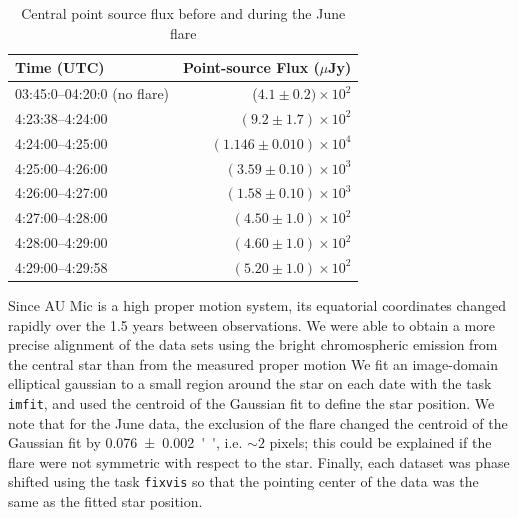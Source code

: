 \documentclass[12pt,oneside]{article}
\begin{document}
\begin{table}	
  \centering
	\caption{Central point source flux before and during the June flare}
  \label{tab:flare fluxes}
  \begin{tabular}{lr}
    \toprule
    Time (UTC) & Point-source Flux ($\mu$Jy) \\
    \midrule
    03:45:0--04:20:0 (no flare) & ($4.1 \pm 0.2)  \times 10^2$\\
  	4:23:38--4:24:00 & $(9.2 \pm 1.7) \times 10^2$ \\
  	4:24:00--4:25:00 & $(1.146 \pm 0.010) \times 10^4$ \\
  	4:25:00--4:26:00 & $(3.59 \pm 0.10) \times 10^3$ \\
  	4:26:00--4:27:00 & $(1.58 \pm 0.10) \times 10^3$ \\
  	4:27:00--4:28:00 & $(4.50 \pm 1.0) \times 10^2$ \\
  	4:28:00--4:29:00 & $(4.60 \pm 1.0) \times 10^2$ \\
  	4:29:00--4:29:58 & $(5.20 \pm 1.0) \times 10^2$\\
    \bottomrule
  \end{tabular}
\end{table}


Since AU Mic is a high proper motion system, its equatorial coordinates changed rapidly over the 1.5 years between observations.  
We were able to obtain a more precise alignment of the data sets using the bright chromospheric emission from the central star than from the measured proper motion
We fit an image-domain elliptical gaussian to a small region around the star on each date with the task \texttt{imfit}, and used the centroid of the Gaussian fit to define the star position.
We note that for the June data, the exclusion of the flare changed the centroid of the Gaussian fit by \SI{.076 \pm 0.002}{''}, i.e. $\sim 2$ pixels; this could be explained if the flare were not symmetric with respect to the star.
Finally, each dataset was phase shifted using the task \texttt{fixvis} so that the pointing center of the data was the same as the fitted star position.
\end{document}
